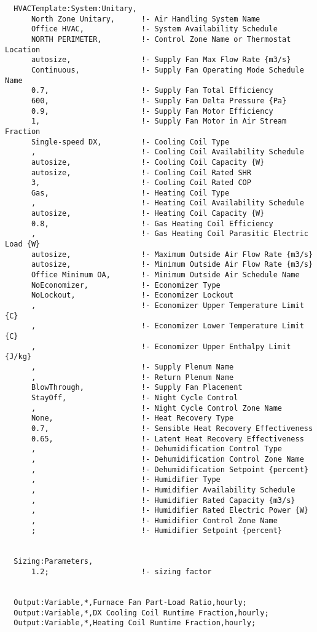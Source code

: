 \begin{lstlisting}
  HVACTemplate:System:Unitary,
      North Zone Unitary,      !- Air Handling System Name
      Office HVAC,             !- System Availability Schedule
      NORTH PERIMETER,         !- Control Zone Name or Thermostat Location
      autosize,                !- Supply Fan Max Flow Rate {m3/s}
      Continuous,              !- Supply Fan Operating Mode Schedule Name
      0.7,                     !- Supply Fan Total Efficiency
      600,                     !- Supply Fan Delta Pressure {Pa}
      0.9,                     !- Supply Fan Motor Efficiency
      1,                       !- Supply Fan Motor in Air Stream Fraction
      Single-speed DX,         !- Cooling Coil Type
      ,                        !- Cooling Coil Availability Schedule
      autosize,                !- Cooling Coil Capacity {W}
      autosize,                !- Cooling Coil Rated SHR
      3,                       !- Cooling Coil Rated COP
      Gas,                     !- Heating Coil Type
      ,                        !- Heating Coil Availability Schedule
      autosize,                !- Heating Coil Capacity {W}
      0.8,                     !- Gas Heating Coil Efficiency
      ,                        !- Gas Heating Coil Parasitic Electric Load {W}
      autosize,                !- Maximum Outside Air Flow Rate {m3/s}
      autosize,                !- Minimum Outside Air Flow Rate {m3/s}
      Office Minimum OA,       !- Minimum Outside Air Schedule Name
      NoEconomizer,            !- Economizer Type
      NoLockout,               !- Economizer Lockout
      ,                        !- Economizer Upper Temperature Limit {C}
      ,                        !- Economizer Lower Temperature Limit {C}
      ,                        !- Economizer Upper Enthalpy Limit {J/kg}
      ,                        !- Supply Plenum Name
      ,                        !- Return Plenum Name
      BlowThrough,             !- Supply Fan Placement
      StayOff,                 !- Night Cycle Control
      ,                        !- Night Cycle Control Zone Name
      None,                    !- Heat Recovery Type
      0.7,                     !- Sensible Heat Recovery Effectiveness
      0.65,                    !- Latent Heat Recovery Effectiveness
      ,                        !- Dehumidification Control Type
      ,                        !- Dehumidification Control Zone Name
      ,                        !- Dehumidification Setpoint {percent}
      ,                        !- Humidifier Type
      ,                        !- Humidifier Availability Schedule
      ,                        !- Humidifier Rated Capacity {m3/s}
      ,                        !- Humidifier Rated Electric Power {W}
      ,                        !- Humidifier Control Zone Name
      ;                        !- Humidifier Setpoint {percent}


  Sizing:Parameters,
      1.2;                     !- sizing factor


  Output:Variable,*,Furnace Fan Part-Load Ratio,hourly;
  Output:Variable,*,DX Cooling Coil Runtime Fraction,hourly;
  Output:Variable,*,Heating Coil Runtime Fraction,hourly;
\end{lstlisting}

